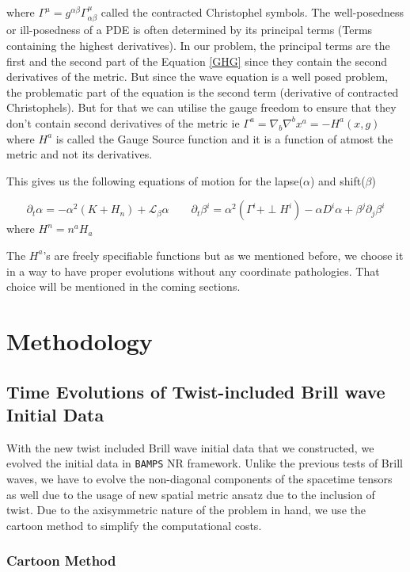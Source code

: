 \documentclass[11pt]{article}
\begin{document}
where $
\Gamma^\mu = g^{\alpha\beta} \Gamma^\mu_{\alpha\beta}$ called the contracted Christophel symbols. The well-posedness or ill-posedness of a PDE is often determined by its principal terms (Terms containing the highest derivatives). In our problem, the principal terms are the first and the second part of the Equation \ref{GHG} since they contain the second derivatives of the metric. But since the wave equation is a well posed problem, the problematic part of the equation is the second term (derivative of contracted Christophels). But for that we can utilise the gauge freedom to ensure that they don't contain second derivatives of the metric ie
$\Gamma^a=\nabla_b \nabla^b x^a=-H^a(x,g)$ where $H^a$ is called the Gauge Source function and it is a function of atmost the metric and not its derivatives.

This gives us the following equations of motion for the lapse($\alpha$) and shift($\beta$)

\begin{equation}
\partial_t \alpha = -\alpha^2 (K + H_n) + \mathcal{L}_\beta \alpha
\qquad \partial_t \beta^i = \alpha^2 (\Gamma^i + \perp H^i) - \alpha D^i \alpha + \beta^j \partial_j \beta^i
\label{lapse=shift}
\end{equation}
where $H^n= n^a H_a$

The $H^a$'s are freely specifiable functions but as we mentioned before, we choose it in a way to have proper evolutions without any coordinate pathologies. That choice will be mentioned in the coming sections.


\section{Methodology}

\subsection{Time Evolutions of Twist-included Brill wave Initial Data}

With the new twist included Brill wave initial data that we constructed, we evolved the initial data in \texttt{BAMPS} NR framework. Unlike the previous tests of Brill waves, we have to evolve the non-diagonal components of the spacetime tensors as well due to the usage of new spatial metric ansatz due to the inclusion of twist. Due to the axisymmetric nature of the problem in hand, we use the cartoon method to simplify the computational costs.

\subsubsection{Cartoon Method \cite{alcubierre_brgmann_holz_takahashi_brandt_seidel_thornburg_2001}}
\label{Cartoon}
\end{document}
